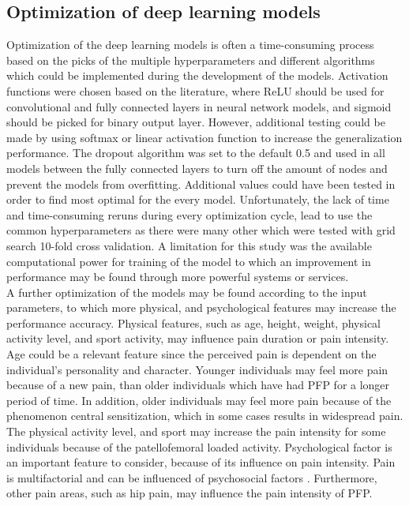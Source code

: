 \subsection{Optimization of deep learning models}
Optimization of the deep learning models is often a time-consuming process based on the picks of the multiple hyperparameters and different algorithms which could be implemented during the development of the models. 
Activation functions were chosen based on the literature, where ReLU should be used for convolutional and fully connected layers in neural network models, and sigmoid should be picked for binary output layer. However, additional testing could be made by using softmax or linear activation function to increase the generalization performance. The dropout algorithm was set to the default 0.5 and used in all models between the fully connected layers to turn off the amount of nodes and prevent the models from overfitting. Additional values could have been tested in order to find most optimal for the every model.
Unfortunately, the lack of time and time-consuming reruns during every optimization cycle, lead to use the common hyperparameters as there were many other which were tested with grid search 10-fold cross validation.
A limitation for this study was the available computational power for training of the model to which an improvement in performance may be found through more powerful systems or services. \\
\noindent
A further optimization of the models may be found according to the input parameters, to which more physical, and psychological features may increase the performance accuracy. Physical features, such as age, height, weight, physical activity level, and sport activity, may influence pain duration or pain intensity. Age could be a relevant feature since the perceived pain is dependent on the individual's personality and character. Younger individuals may feel more pain because of a new pain, than older individuals which have had PFP for a longer period of time. In addition, older individuals may feel more pain because of the phenomenon central sensitization, which in some cases results in widespread pain. The physical activity level, and sport may increase the pain intensity for some individuals because of the patellofemoral loaded activity. Psychological factor is an important feature to consider, because of its influence on pain intensity. Pain is multifactorial and can be influenced of psychosocial factors \citep{Roos2003}. Furthermore, other pain areas, such as hip pain, may influence the pain intensity of PFP.
